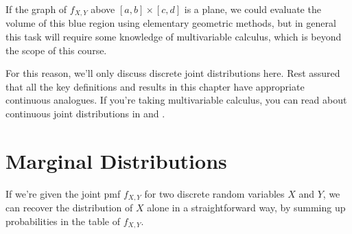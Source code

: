If the graph of $f_{X,Y}$ above $[a,b] \times [c,d]$ is a plane, we could evaluate the volume of this blue region using elementary geometric methods, but in general this task will require some knowledge of multivariable calculus, which is beyond the scope of this course. 
\par
For this reason, we'll only discuss discrete joint distributions here. Rest assured that all the key definitions and results in this chapter have appropriate continuous analogues. If you're taking multivariable calculus, you can read about continuous joint distributions in \cite{StewartMultivariable} and \cite{Ghahramani}.

\section{Marginal Distributions}

If we're given the joint pmf $f_{X,Y}$ for two discrete random variables $X$ and $Y$, we can recover the distribution of $X$ alone in a straightforward way, by summing up probabilities in the table of $f_{X,Y}$.

